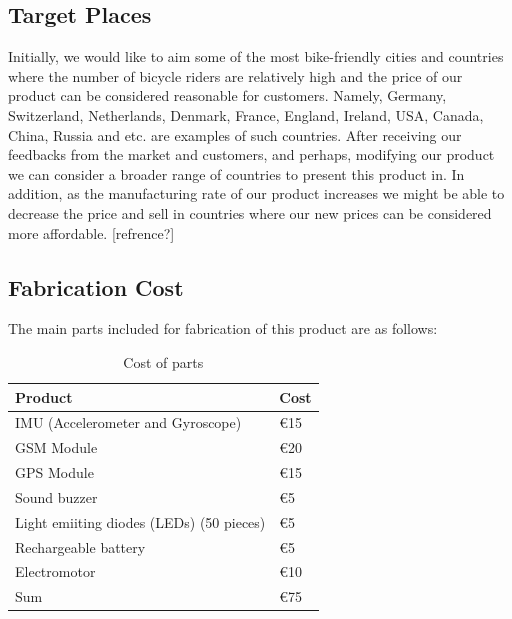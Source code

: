\documentclass{article}
\begin{document}
	
	\subsection{Target Places}
	Initially, we would like to aim some of the most bike-friendly cities and countries where the number of bicycle riders are relatively high and the price of our product can be considered reasonable for customers. Namely, Germany, Switzerland, Netherlands, Denmark, France, England, Ireland, USA, Canada, China, Russia and etc. are examples of such countries. After receiving our feedbacks from the market and customers, and perhaps, modifying our product we can consider a broader range of countries to present this product in. In addition, as the manufacturing rate of our product increases we might be able to decrease the price and sell in countries where our new prices can be considered more affordable. [refrence?]
	
	
	\subsection{Fabrication Cost}
	The main parts included for fabrication of this product are as follows: \\[1cm]
	
	\begin{table}[h]
		\begin{center}
			\begin{tabular}{|C{9cm}|C{2cm}|}
				\hline
				\bfseries{Product} & \bfseries{Cost}\\ 
				\hline
				IMU (Accelerometer and Gyroscope) & \euro 15\\
				\hline
				GSM Module & \euro 20\\ 
				\hline
				GPS Module & \euro 15\\
				\hline
				Sound buzzer & \euro 5 \\ 
				\hline
				Light emiiting diodes (LEDs) (50 pieces) & \euro 5 \\ 
				\hline
				Rechargeable battery & \euro 5\\ 
				\hline
				Electromotor & \euro 10\\ 
				\hline
				Sum & \euro 75\\
				\hline
				
			\end{tabular}
			\caption{Cost of parts}
		\end{center}
	\end{table}
	
	
	\newpage
	
\end{document}
